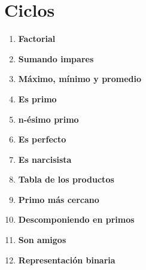 \section{Ciclos}
\begin{enumerate}
    \item \textbf{Factorial}\\
    

    \item \textbf{Sumando impares}\\
    

    \item \textbf{Máximo, mínimo y promedio}\\
    

    \item \textbf{Es primo}\\
    

    \item \textbf{n-ésimo primo}\\
    
    
    \item \textbf{Es perfecto}\\
    

    \item \textbf{Es narcisista}\\
    

    \item \textbf{Tabla de los productos}
    

    \item \textbf{Primo más cercano}\\
    

    \item \textbf{Descomponiendo en primos}\\
    
    
    \item \textbf{Son amigos}\\
    

    \item \textbf{Representación binaria}
    
\end{enumerate}

